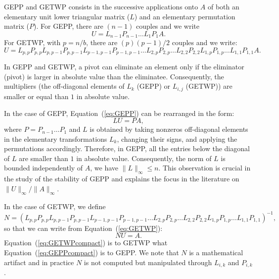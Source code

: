 \documentclass{article}
\begin{document}
GEPP and GETWP consists in the successive applications onto $A$ of both an elementary unit lower triangular matrix ($L$)
and an elementary permutation matrix ($P$).
For GEPP, there are $(n-1)$ couples and we write
\begin{equation}\label{eq:GEPP} U  = L_{n-1} P_{n-1} \ldots  L_1 P_1 A.\end{equation}
For GETWP, with $p=n/b$, there are $(p)(p-1)/2$ couples and we write:
\begin{equation}\label{eq:GETWP} 
U  = 
  L_{p,p} P_{p,p}  
  L_{p,p-1} P_{p,p-1} L_{p-1,p-1} P_{p-1,p-1}
  \ldots
  L_{2,p} P_{2,p} \ldots  L_{2,2} P_{2,2} 
  L_{1,p} P_{1,p} \ldots  L_{1,1} P_{1,1} A.
\end{equation}

In GEPP and GETWP, a pivot can eliminate an element only if
the eliminator (pivot) is larger in absolute value than the eliminatee. 
Consequently, the multipliers
(the off-diagonal elements of $L_k$ (GEPP) or $L_{i,j}$ (GETWP)) are
smaller or equal than $1$ in absolute value.

In the case of GEPP, Equation~(\ref{eq:GEPP}) can be rearranged in the form:
\begin{equation}\label{eq:GEPPcompact} 
 L U = P A, 
\end{equation}
where $P = P_{n-1}\ldots P_1$ and $L$ is obtained
by taking nonzeros off-diagonal elements in the elementary transformations $L_k$,
changing their signs, and applying the permutations accordingly.
Therefore, in GEPP, all the entries below the diagonal of $L$ are
smaller than $1$ in absolute value. Consequently, the norm of $L$ is bounded independently of $A$,
we have $\| L \|_\infty \leq n$. This observation is crucial in the study of the stability 
of GEPP and explains the focus in the literature on $\| U \|_\infty/\|A\|_\infty$.

In the case of GETWP, we define
\begin{equation}\label{eq:formula N}
N = 
\left(
  L_{p,p} P_{p,p}  
  L_{p,p-1} P_{p,p-1} L_{p-1,p-1} P_{p-1,p-1}
  \ldots
  L_{2,p} P_{2,p} \ldots  L_{2,2} P_{2,2} 
  L_{1,p} P_{1,p} \ldots  L_{1,1} P_{1,1}
\right)^{-1},
\end{equation}
so that we can write from Equation~(\ref{eq:GETWP}): 
\begin{equation}\label{eq:GETWPcompact} 
N U = A. 
\end{equation}
Equation~(\ref{eq:GETWPcompact}) is to GETWP what 
Equation~(\ref{eq:GEPPcompact}) is to GEPP.
We note that $N$ is a mathematical artifact and in practice $N$ is not computed but manipulated through $L_{i,k}$ and $P_{i,k}$.
\end{document}
